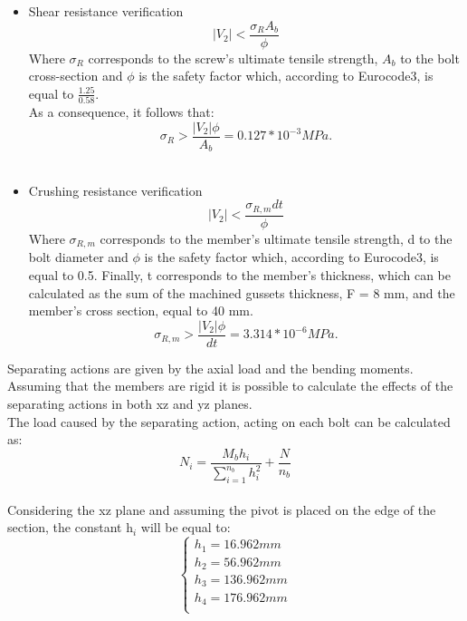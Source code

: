 \begin{itemize}
    \item Shear resistance verification
    \begin{equation}
        |V_{2}| < \frac{\sigma_{R}A_{b}}{\phi}
    \end{equation}
    Where $\sigma_{R}$ corresponds to the screw's ultimate tensile strength, $A_{b}$ to the bolt cross-section and $\phi$ is the safety factor which, according to Eurocode3, is equal to $\frac{1.25}{0.58}$.\\
    As a consequence, it follows that:\\
    \begin{equation}
       \sigma_{R} > \frac{|V_{2}|\phi}{A_{b}} = 0.127* 10^{-3} MPa.
    \end{equation}\\
    \item Crushing resistance verification\\
    \begin{equation}
        |V_{2}| < \frac{\sigma_{R,m}dt}{\phi}
    \end{equation}
    Where $\sigma_{R,m}$ corresponds to the member's ultimate tensile strength, d to the bolt diameter and $\phi$ is the safety factor which, according to Eurocode3, is equal to 0.5. Finally, t corresponds to the member's thickness, which can be calculated as the sum of the machined gussets thickness, F = 8 mm, and the member's cross section, equal to 40 mm.
     \begin{equation}
       \sigma_{R,m} > \frac{|V_{2}|\phi}{dt} = 3.314 * 10^{-6} MPa.
    \end{equation}
\end{itemize}
Separating actions are given by the axial load and the bending moments.\\
Assuming that the members are rigid it is possible to calculate the effects of the separating actions in both xz and yz planes.\\
The load caused by the separating action, acting on each bolt can be calculated as:\\
\begin{equation}
    N_{i} = \frac{M_{b}h_{i}}{\sum\limits_{i=1}^{n_{b}} h^2_{i}} + \frac{N}{n_{b}}
\end{equation}\\
Considering the xz plane and assuming the pivot is placed on the edge of the section, the constant h$_{i}$ will be equal to:\\
\begin{equation}
   \begin{cases}
    h_{1} = 16.962 mm\\
    h_{2} = 56.962 mm\\
    h_{3} = 136.962 mm\\
    h_{4} = 176.962 mm\\
    \end{cases} 
\end{equation}\\
